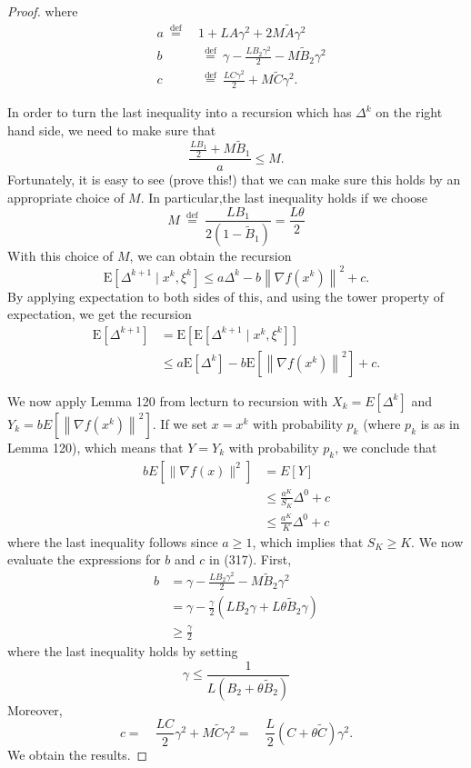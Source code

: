 \documentclass[8pt,a4paper]{article}
\begin{document}
\begin{proof}
		
		where
		$$
		\begin{aligned}
			&a \stackrel{\text { def }}{=} & 1+L A \gamma^{2}+2 M \tilde{A} \gamma^{2} \\
			&b & \stackrel{\text { def }}{=} \gamma-\frac{L B_{2} \gamma^{2}}{2}-M \tilde{B}_{2} \gamma^{2} \\
			&c & \stackrel{\text { def }}{=} \frac{L C \gamma^{2}}{2}+M \tilde{C} \gamma^{2} .
		\end{aligned}
		$$
		
		In order to turn the last inequality  into a recursion which has $\Delta^{k}$ on the right hand side, we need to make sure that
		$$
		\frac{\frac{L B_{1}}{2}+M \tilde{B}_{1}}{a} \leq M .
		$$
		Fortunately, it is easy to see (prove this!) that we can make sure this holds by an appropriate choice of $M$. In particular,the last  inequality holds if we choose
		$$
		M \stackrel{\text { def }}{=} \frac{L B_{1}}{2\left(1-\tilde{B}_{1}\right)}=\frac{L \theta}{2}
		$$
		With this choice of $M$, we can obtain the recursion
		$$
		\mathrm{E}\left[\Delta^{k+1} \mid x^{k}, \xi^{k}\right] \leq a \Delta^{k}-b\left\|\nabla f\left(x^{k}\right)\right\|^{2}+c .
		$$
		By applying expectation to both sides of this, and using the tower property of expectation, we get the recursion
		$$
		\begin{aligned}
			\mathrm{E}\left[\Delta^{k+1}\right] &=\mathrm{E}\left[\mathrm{E}\left[\Delta^{k+1} \mid x^{k}, \xi^{k}\right]\right] \\
			& {\leq}  a \mathrm{E}\left[\Delta^{k}\right]-b \mathrm{E}\left[\left\|\nabla f\left(x^{k}\right)\right\|^{2}\right]+c .
		\end{aligned}
		$$
		
		We now apply Lemma 120 from lecturn to recursion with $X_{k}=E\left[\Delta^{k}\right]$ and $Y_{k}=b E\left[\left\|\nabla f\left(x^{k}\right)\right\|^{2}\right]$. If we set $x=x^{k}$ with probability $p_{k}$ (where $p_{k}$ is as in Lemma 120), which means that $Y=Y_{k}$ with probability $p_{k}$, we conclude that
		$$
		\begin{aligned}
			b E\left[\|\nabla f(x)\|^{2}\right]  &= E[Y] \\
			&\leq  \frac{a^{K}}{S_{K}} \Delta^{0}+c \\
			& \leq  \frac{a^{K}}{K} \Delta^{0}+c
		\end{aligned}
		$$
		where the last inequality follows since $a \geq 1$, which implies that $S_{K} \geq K$. We now evaluate the expressions for $b$ and $c$ in (317). First,
		$$
		\begin{aligned}
			b & {=} \gamma-\frac{L B_{2} \gamma^{2}}{2}-M \tilde{B}_{2} \gamma^{2} \\
		&{=}  \gamma-\frac{\gamma}{2}\left(L B_{2} \gamma+L \theta \tilde{B}_{2} \gamma\right) \\
			& \geq \frac{\gamma}{2}
		\end{aligned}
		$$
		where the last inequality holds by setting
		$$
		\gamma \leq \frac{1}{L\left(B_{2}+\theta \tilde{B}_{2}\right)}
		$$
		Moreover,
		$$
		c {=} \quad \frac{L C}{2} \gamma^{2}+M \tilde{C} \gamma^{2} {=} \quad \frac{L}{2}(C+\theta \tilde{C}) \gamma^{2} .
		$$
		We obtain the results.
	\end{proof}
	
\end{document}
